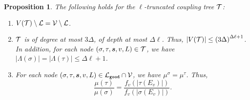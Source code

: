 \documentclass[11pt]{article}
\newtheorem{proposition}[theorem]{Proposition}
\newcommand{\abs}[1]{\left\vert#1\right\vert}
\def\!#1{\mathtt{#1}}
\newcommand{\seqS}{\boldsymbol{s}}
\begin{document}
\begin{proposition} \label{prop:property-of-truncated-tree}
The following holds for the $\ell$-truncated coupling tree $\mathcal{T}$:
\begin{enumerate}[(1)]
\item $V(\mathcal{T})\setminus \mathcal{L} = \mathcal{V}\setminus\mathcal{L}$. \label{item:CT-property-1}
\item $\mathcal{T}$ is of degree at most $3\Delta$, of depth at most $\Delta \ell$.
Thus, $\abs{V(\+T)}\leq \left(3\Delta\right)^{\Delta \ell + 1}$.
In addition, for each node $(\sigma,\tau,\seqS,v,L)\in \+T$, we have $\abs{\Lambda(\sigma)} = \abs{\Lambda(\tau)} \leq \Delta \ell + 1$. \label{item:CT-property-size}
\item For each node $(\sigma,\tau,\seqS,v,L)\in \+L_{\!{good}}\cap \+V$, we have $\mu^\sigma = \mu^\tau$. Thus, 
\[\frac{\mu(\tau)}{\mu(\sigma)} =  \frac{f_v\left(\abs{\tau(E_v)}\right)}{f_v\left(\abs{\sigma({E_v})}\right)}.\] \label{item:CT-property-ratio}
\end{enumerate}
\end{proposition}
\end{document}
